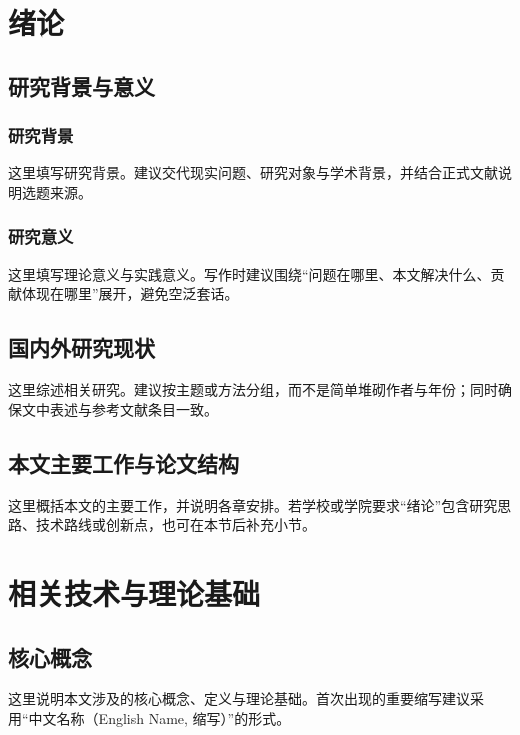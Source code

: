 
\chapter{绪论}

\section{研究背景与意义}

\subsection{研究背景}

这里填写研究背景。建议交代现实问题、研究对象与学术背景，并结合正式文献说明选题来源\cite{sample_article,sample_book}。

\subsection{研究意义}

这里填写理论意义与实践意义。写作时建议围绕“问题在哪里、本文解决什么、贡献体现在哪里”展开，避免空泛套话。

\section{国内外研究现状}

这里综述相关研究。建议按主题或方法分组，而不是简单堆砌作者与年份；同时确保文中表述与参考文献条目一致。

\section{本文主要工作与论文结构}

这里概括本文的主要工作，并说明各章安排。若学校或学院要求“绪论”包含研究思路、技术路线或创新点，也可在本节后补充小节。

\chapter{相关技术与理论基础}

\section{核心概念}

这里说明本文涉及的核心概念、定义与理论基础。首次出现的重要缩写建议采用“中文名称（English Name, 缩写）”的形式。

